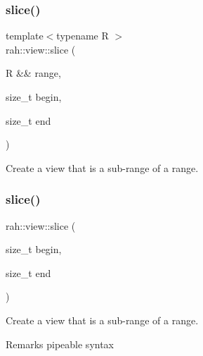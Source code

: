 \subsubsection{\texorpdfstring{slice()}{slice()}\hspace{0.1cm}{\footnotesize\ttfamily [1/2]}}
{\footnotesize\ttfamily template$<$typename R $>$ \\
rah\+::view\+::slice (\begin{DoxyParamCaption}\item[{R \&\&}]{range,  }\item[{size\+\_\+t}]{begin,  }\item[{size\+\_\+t}]{end }\end{DoxyParamCaption})}



Create a view that is a sub-\/range of a range. 


\begin{DoxyCodeInclude}{0}
\end{DoxyCodeInclude}
\mbox{\label{namespacerah_1_1view_a727bbf69817ca3e940597885764e2032}} 
\subsubsection{\texorpdfstring{slice()}{slice()}\hspace{0.1cm}{\footnotesize\ttfamily [2/2]}}
{\footnotesize\ttfamily rah\+::view\+::slice (\begin{DoxyParamCaption}\item[{size\+\_\+t}]{begin,  }\item[{size\+\_\+t}]{end }\end{DoxyParamCaption})}



Create a view that is a sub-\/range of a range. 

\begin{DoxyRemark}{Remarks}
pipeable syntax
\end{DoxyRemark}

